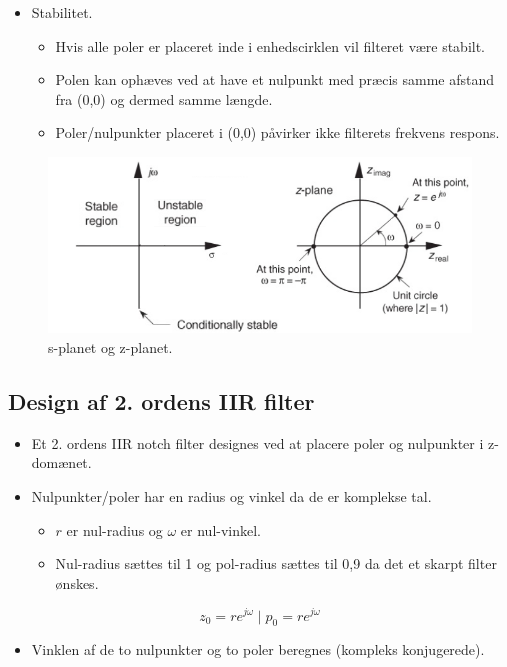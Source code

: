 \documentclass[danish]{article}
\begin{document}
\begin{itemize}
	\item Stabilitet.
	\begin{itemize}
		\item Hvis alle poler er placeret inde i enhedscirklen vil filteret være stabilt.
		\item Polen kan ophæves ved at have et nulpunkt med præcis samme afstand fra (0,0) og dermed samme længde.
		\item Poler/nulpunkter placeret i (0,0) påvirker ikke filterets frekvens respons. 
	\end{itemize}
\end{itemize}

\begin{figure}[H]
	\centering
	\includegraphics[width=0.8\linewidth]{graphics/unitycircle}
	\caption{s-planet og z-planet.}
	\label{fig:unitycircle}
\end{figure}

\subsection{Design af 2. ordens IIR filter}
\begin{itemize}
	\item Et 2. ordens IIR notch filter designes ved at placere poler og nulpunkter i z-domænet.
	\item Nulpunkter/poler har en radius og vinkel da de er komplekse tal.
	\begin{itemize}
		\item $r$ er nul-radius og $\omega$ er nul-vinkel.
		\item Nul-radius sættes til 1 og pol-radius sættes til 0,9 da det et skarpt filter ønskes.
	\end{itemize}
\end{itemize}

\begin{equation}
z_0 = r e^{j\omega} \mid p_0 = r e^{j\omega}
\end{equation}

\begin{itemize}
	\item Vinklen af de to nulpunkter og to poler beregnes (kompleks konjugerede).
\end{itemize}
\end{document}

